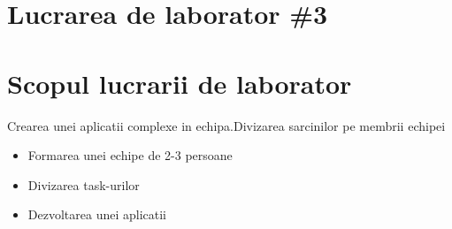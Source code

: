 \section*{Lucrarea de laborator \#3}

\section{Scopul lucrarii de laborator}
Crearea unei aplicatii complexe in echipa.Divizarea sarcinilor pe membrii echipei

\begin{itemize}
	\item Formarea unei echipe de 2-3 persoane
	\item Divizarea task-urilor
	\item Dezvoltarea unei aplicatii
\end{itemize}

\clearpage